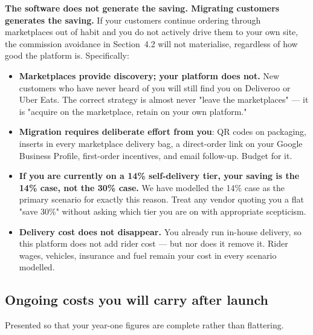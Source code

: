 \documentclass[11pt,a4paper]{article}
\begin{document}
\begin{warnbox}
\textbf{The software does not generate the saving. Migrating customers generates the
saving.} If your customers continue ordering through marketplaces out of habit and you
do not actively drive them to your own site, the commission avoidance in Section~4.2
will not materialise, regardless of how good the platform is. Specifically:

\begin{itemize}
\item \textbf{Marketplaces provide discovery; your platform does not.} New customers who
have never heard of you will still find you on Deliveroo or Uber Eats. The correct
strategy is almost never "leave the marketplaces" --- it is "acquire on the marketplace,
retain on your own platform."
\item \textbf{Migration requires deliberate effort from you}: QR codes on packaging,
inserts in every marketplace delivery bag, a direct-order link on your Google Business
Profile, first-order incentives, and email follow-up. Budget for it.
\item \textbf{If you are currently on a 14\% self-delivery tier, your saving is the 14\%
case, not the 30\% case.} We have modelled the 14\% case as the primary scenario for
exactly this reason. Treat any vendor quoting you a flat "save 30\%" without asking
which tier you are on with appropriate scepticism.
\item \textbf{Delivery cost does not disappear.} You already run in-house delivery, so
this platform does not add rider cost --- but nor does it remove it. Rider wages,
vehicles, insurance and fuel remain your cost in every scenario modelled.
\end{itemize}
\end{warnbox}

\subsection{Ongoing costs you will carry after launch}

Presented so that your year-one figures are complete rather than flattering.
\end{document}
